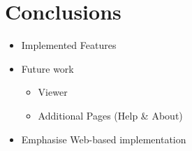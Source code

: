 \chapter{Conclusions} \label{chap:conclusions}

\begin{itemize}
	\item Implemented Features
	\item Future work
	\begin{itemize}
		\item Viewer
		\item Additional Pages (Help \& About)
	\end{itemize}
	\item Emphasise Web-based implementation
\end{itemize}
